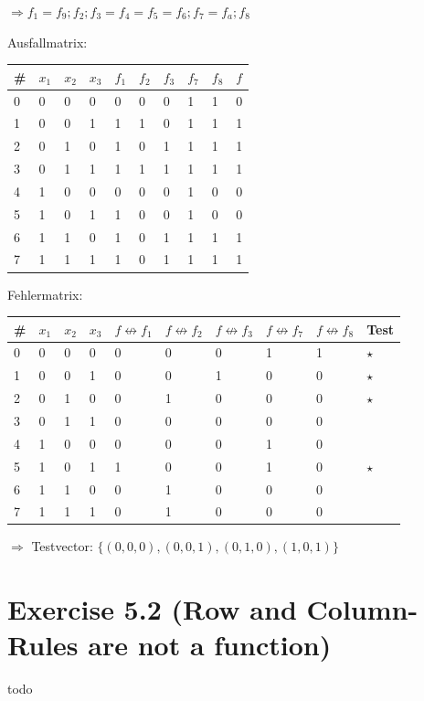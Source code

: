 \documentclass[10pt,a4paper]{scrartcl}
\begin{document}
$\Longrightarrow f_1=f_9 ; f_2 ; f_3=f_4=f_5=f_6 ; f_7=f_a ; f_8$

Ausfallmatrix:
\begin{tabular}{|l||lll||l|l|l|l|l||l|}\hline
\# & $x_1$&$x_2$&$x_3$&$f_1$&$f_2$&$f_3$&$f_7$&$f_8$&$f$ \\\hline\hline
0  & 0&0&0            & 0   & 0   & 0   & 1   & 1   & 0  \\
1  & 0&0&1            & 1   & 1   & 0   & 1   & 1   & 1  \\
2  & 0&1&0            & 1   & 0   & 1   & 1   & 1   & 1  \\
3  & 0&1&1            & 1   & 1   & 1   & 1   & 1   & 1  \\
4  & 1&0&0            & 0   & 0   & 0   & 1   & 0   & 0  \\
5  & 1&0&1            & 1   & 0   & 0   & 1   & 0   & 0  \\
6  & 1&1&0            & 1   & 0   & 1   & 1   & 1   & 1  \\
7  & 1&1&1            & 1   & 0   & 1   & 1   & 1   & 1  \\\hline
\end{tabular}

Fehlermatrix:
\begin{tabular}{|l||lll||l|l|l|l|l||l|}\hline
\# & $x_1$&$x_2$&$x_3$&$f\nleftrightarrow f_1$&$f\nleftrightarrow f_2$&$f\nleftrightarrow f_3$&$f\nleftrightarrow f_7$&$f\nleftrightarrow f_8$ & Test\\\hline\hline
0  & 0&0&0            & 0   & 0   & 0   & 1   & 1 & $\star$ \\
1  & 0&0&1            & 0   & 0   & 1   & 0   & 0 & $\star$ \\
2  & 0&1&0            & 0   & 1   & 0   & 0   & 0 & $\star$ \\
3  & 0&1&1            & 0   & 0   & 0   & 0   & 0 & \\
4  & 1&0&0            & 0   & 0   & 0   & 1   & 0 & \\
5  & 1&0&1            & 1   & 0   & 0   & 1   & 0 & $\star$ \\
6  & 1&1&0            & 0   & 1   & 0   & 0   & 0 & \\
7  & 1&1&1            & 0   & 1   & 0   & 0   & 0 & \\\hline
\end{tabular}

$\Longrightarrow$ Testvector: $\{(0,0,0),(0,0,1),(0,1,0),(1,0,1)\}$


\FloatBarrier
\section*{Exercise 5.2 (Row and Column-Rules are not a function)}
todo
\end{document}
